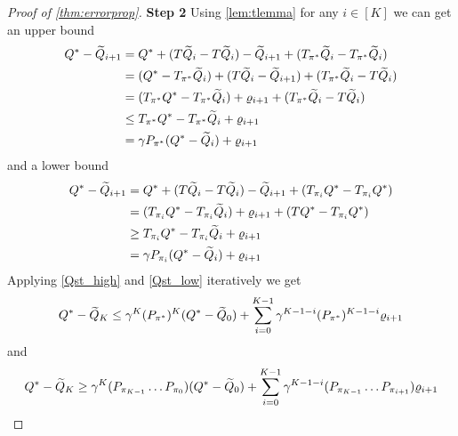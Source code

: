 \begin{proof}[Proof of \cref{thm:errorprop}]
  \textbf{Step 2}
  Using \cref{lem:tlemma} for any $i \in [K]$ we can get an upper bound
  \begin{align}
    Q^* - \widetilde{Q}_{i+1} &= Q^* + (T\widetilde{Q}_i - T \widetilde{Q}_i) - \widetilde{Q}_{i+1}
    + (T_{\pi^*}\widetilde{Q}_i - T_{\pi^*}\widetilde{Q}_i) \notag
    \\ &= (Q^* - T_{\pi^*} \widetilde{Q}_i) + (T \widetilde{Q}_i - \widetilde{Q}_{i+1})
    + (T_{\pi^*}\widetilde{Q}_i - T \widetilde{Q}_i) \notag
    \\ &= (T_{\pi^*} Q^* - T_{\pi^*} \widetilde{Q}_i) + \varrho_{i+1}
    + (T_{\pi^*}\widetilde{Q}_i - T \widetilde{Q}_i) \notag
    \\ &\leq T_{\pi^*} Q^* - T_{\pi^*} \widetilde{Q}_i + \varrho_{i+1} \notag
    \\ &= \gamma P_{\pi^*} (Q^* - \widetilde{Q}_i) + \varrho_{i+1} \label{Qst_high}
  \end{align}
  and a lower bound
  \begin{align}
    Q^* - \widetilde{Q}_{i+1} &= Q^* + (T\widetilde{Q}_i - T \widetilde{Q}_i) - \widetilde{Q}_{i+1}
    + (T_{\pi_i}Q^* - T_{\pi_i}Q^*) \notag
    \\ &= (T_{\pi_i}Q^* - T_{\pi_i} \widetilde{Q}_i) + \varrho_{i+1}
    + (T Q^* - T_{\pi_i} Q^*) \notag
    \\ &\geq T_{\pi_i}Q^* - T_{\pi_i} \widetilde{Q}_i + \varrho_{i+1} \notag
    \\ &= \gamma P_{\pi_i} (Q^* - \widetilde{Q}_i) + \varrho_{i+1} \label{Qst_low}
  \end{align}
  Applying \cref{Qst_high} and \cref{Qst_low} iteratively we get  
  \begin{align}
    Q^* - \widetilde{Q}_K \leq \gamma^K (P_{\pi^*})^K (Q^* - \widetilde{Q}_0)
    + \sum_{i=0}^{K-1} \gamma^{K-1-i} (P_{\pi^*})^{K-1-i} \varrho_{i+1}
    \label{eq:Qsk_high}
  \end{align}
  and
  \begin{align}
    Q^* - \widetilde{Q}_K \geq \gamma^K (P_{\pi_{K-1}} \dots P_{\pi_0})(Q^* - \widetilde{Q}_0)
    + \sum_{i=0}^{K-1}\gamma^{K-1-i}(P_{\pi_{K-1}}\dots P_{\pi_{i+1}})
    \varrho_{i+1} \label{eq:Qsk_low}
  \end{align}


\end{proof}
